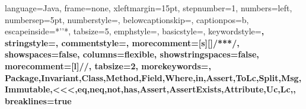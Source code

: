 \usepackage{graphicx}
\usepackage{url}
\usepackage[listings]{tcolorbox}
\usepackage{amssymb}
\usepackage{pifont}

\newcommand{\critics}{{\small{\sc{Critics}}}}
\newcommand{\phabricator}{{\small{\sc{Phabricator}}}}
\newcommand{\gerrit}{{\small{\sc{Gerrit}}}}
\newcommand{\codeflow}{{\small{\sc{CodeFlow}}}}
\newcommand{\collaborator}{{\small{\sc{Collaborator}}}}
\newcommand{\clusterchanges}{{\small{\sc{ClusterChanges}}}}
\newcommand{\delCode}{\textcolor{black}}
\newcommand{\addCode}{\textcolor{black}}
\newcommand{\ttt}[1]{\tt\small{#1}}
\newcommand{\todo}[1]{\textcolor{blue}{#1}}



 {
  language=Java,
  frame=none,
  xleftmargin=15pt, 
  stepnumber=1, 
  numbers=left, 
  numbersep=5pt,
  numberstyle=\tiny\color[gray]{0.777}, 
  belowcaptionskip=\bigskipamount,
  captionpos=b, 
  escapeinside={*'}{'*},
  tabsize=5,
  emphstyle={\bf},
  basicstyle=\scriptsize\ttfamily,
  keywordstyle=\color{javapurple}\bfseries,
  stringstyle=\color{javared},
  commentstyle=\color{javagreen},
  morecomment=[s][\color{javadocblue}]{/**}{*/},
  showspaces=false,
  columns=flexible,
  showstringspaces=false,
  morecomment=[l]{//},
  tabsize=2,
  morekeywords={, Package,Invariant,Class,Method,Field,Where,in,Assert,ToLc,Split,Msg,Immutable,<<<,eq,neq,not,has,Assert,AssertExists,Attribute,Uc,Lc,},
  breaklines=true
}

